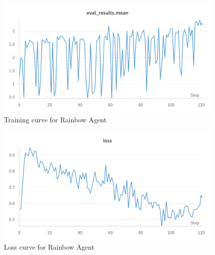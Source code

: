   \begin{figure}[h]
    \centering
    \includegraphics[width=\linewidth]{results/RAINBOW-mean.png}
    \caption{
      Training curve for Rainbow Agent
    }
    \label{fig:rainbowmean}
  \end{figure}
  \begin{figure}[h]
    \centering
    \includegraphics[width=\linewidth]{results/RAINBOW-loss.png}
    \caption{
        Loss curve for Rainbow Agent
    }
    \label{fig:rainbowloss}
\end{figure}


